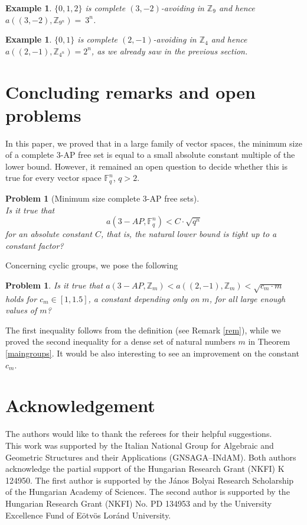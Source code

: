 \documentclass[11pt]{article}
\numberwithin{table}{section}
\newcommand{\F}{{\mathbb F}}
\newtheorem{problem}[theorem]{Problem}
\newtheorem{example}[theorem]{Example}
\theoremstyle{definition}
\begin{document}
	\begin{example}
		$\{0,1,2\}$ is complete $(3,-2)$-avoiding in $\mathbb{Z}_9$ and hence  $a((3,-2),\mathbb{Z}_{9^n})=~3^n$.
	\end{example}
	
	\begin{example}
		$\{0,1\}$ is complete $(2,-1)$-avoiding in $\mathbb{Z}_4$ and hence  $a((2,-1),\mathbb{Z}_{4^n})=2^n$, as we already saw in the previous section.
	\end{example}
	
	\section{Concluding remarks and open problems}
	
	In this paper, we proved that in a large family of vector spaces, the minimum size of a complete $3$-$\mathrm{AP}$ free set is equal to a small absolute constant multiple of the  lower bound. However, it remained an open question to decide whether this is true for every vector space $\F_q^n$, $q>2$.
	
	\begin{problem}[Minimum size complete $3$-AP free sets] \ \\ Is it true that $$a(3-AP, \F_q^n)<C\cdot \sqrt{q^n}$$ for an absolute constant $C$, that is, the natural lower bound is tight up to a constant factor?
	\end{problem} 
	Concerning cyclic groups, we pose the following
	\begin{problem} Is it true that
		$a(3-AP,\mathbb{Z}_m)< a((2,-1), \mathbb{Z}_m)<\sqrt{c_m \cdot m}$ holds for $c_m\in [1, 1.5]$, a constant depending only on $m$, for all large enough values of $m$? 
	\end{problem}
	The first inequality follows from the definition (see Remark \ref{rem}), while we proved the second inequality for a dense set of natural numbers $m$ in Theorem \ref{maingroups}. It would be also interesting to see an improvement on the constant $c_m$.
	
	\section*{Acknowledgement}
	The authors would like to thank the referees for their helpful suggestions.\\
	This work was supported by the Italian National Group for Algebraic and Geometric Structures and their Applications (GNSAGA--INdAM). Both authors acknowledge the partial support of the Hungarian Research Grant (NKFI) K 124950. The first author is supported by the J\'anos Bolyai Research Scholarship of the Hungarian Academy of Sciences. The second author is supported by the Hungarian Research Grant (NKFI) No. PD  134953 and by the University Excellence Fund of Eötvös Loránd University.
	
\end{document}
